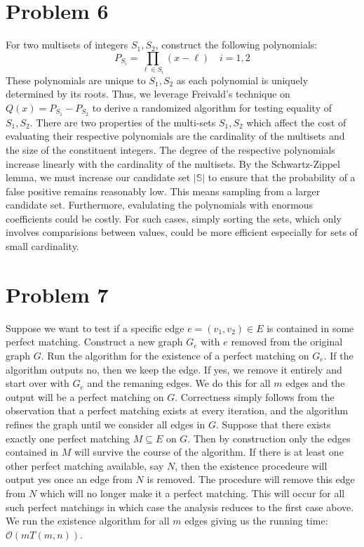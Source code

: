 \documentclass[12pt]{article}%
\begin{document}
\section*{Problem 6}
For two multisets of integers $S_1,S_2$, construct the following polynomials:
$$ P_{S_i} = \prod_{\ell \in S_i} (x - \ell) \quad i = 1,2 $$
These polynomials are unique to $S_1,S_2$ as each polynomial is uniquely determined by its roots. Thus, we leverage Freivald's technique on $Q(x) = P_{S_1} - P_{S_2}$ to derive a randomized algorithm for testing equality of $S_1,S_2$. There are two properties of the multi-sets $S_1,S_2$ which affect the cost of evaluating their respective polynomials are the cardinality of the multisets and the size of the constituent integers. The degree of the respective polynomials increase linearly with the cardinality of the multisets. By the Schwartz-Zippel lemma, we must increase our candidate set $|\mathbb{S}|$ to ensure that the probability of a false positive remains reasonably low. This means sampling from a larger candidate set. Furthermore,
evalulating the polynomials with enormous coefficients could be costly. For such cases, simply sorting the sets, which only involves comparisions between values, could be more efficient especially for sets of small cardinality.

\section*{Problem 7}
Suppose we want to test if a specific edge $e = (v_1,v_2) \in E$ is contained in some perfect matching. Construct a new graph $G_e$ with $e$ removed from the original graph $G$. Run the algorithm for the existence of a perfect matching on $G_e$. If the algorithm outputs no, then we keep the edge. If yes, we remove it entirely and start over with $G_e$ and the remaning edges. We do this for all $m$ edges and the output will be a perfect matching on $G$. \newline \newline
Correctness simply follows from the observation that a perfect matching exists at every iteration, and the algorithm refines the graph until we consider all edges in $G$. Suppose that there exists exactly one perfect matching $M \subseteq E$ on $G$. Then by construction only the edges contained in $M$ will survive the course of the algorithm. If there is at least one other perfect matching available, say $N$, then the existence procedeure will output yes once an edge from $N$ is removed. The procedure will remove this edge from $N$ which will no longer make it a perfect matching. This will occur for all such perfect matchings in which case the analysis reduces to the first case above. \newline \newline
We run the existence algorithm for all $m$ edges giving us the running time:
$\mathcal{O}(mT(m,n))$.
\end{document}
